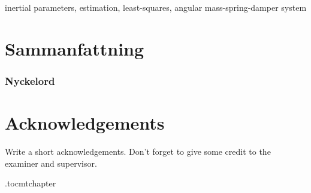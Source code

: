 \documentclass[/home/francois/latex/report/main.tex]{subfiles}
\begin{document}
inertial parameters, estimation, least-squares, angular mass-spring-damper system

\newpage
\thispagestyle{plain}
\chapter*{Sammanfattning}


\subsection*{Nyckelord}


\newpage
\thispagestyle{plain}
\chapter*{Acknowledgements}

Write a short acknowledgements. Don't forget to give some credit to the examiner and supervisor.

\newpage



\newpage

\etocdepthtag.toc{mtchapter}
\thispagestyle{plain}
\tableofcontents

\newpage
\end{document}

